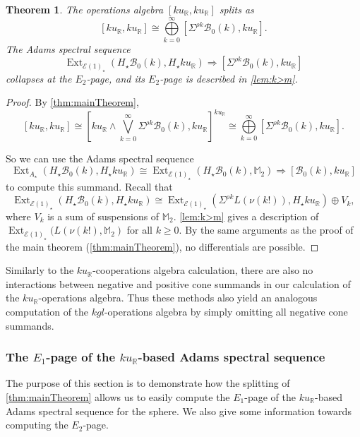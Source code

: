 \documentclass{amsart}
\newtheorem{theorem}[equation]{Theorem}
\theoremstyle{plain}
\numberwithin{equation}{section}
\numberwithin{figure}{section}
\DeclareMathOperator{\Ext}{Ext}
\newcommand{\mM}{{\mathbb M}}
\newcommand{\mR}{{\mathbb R}}
\newcommand{\cB}{{\mathcal B}}
\newcommand{\cE}{{\mathcal E}}
\newcommand{\0}{\langle 0 \rangle }
\begin{document}
\begin{theorem} \label{thm:operationsAlgebra}
     The operations algebra $[ku_\mR, ku_\mR]$ splits as
     \[ [ku_\mR, ku_\mR] \cong \bigoplus\limits_{k=0}^{\infty}[\Sigma^{\rho k}\cB_{0}(k), ku_\mR] .\]
     The Adams spectral sequence 
     \[
     \Ext_{\cE(1)_{\star}}(H_{\star}\cB_{0}(k), H_{\star}ku_\mR) \Longrightarrow [\Sigma^{\rho k}\cB_{0}(k), ku_\mR]
     \] 
     collapses at the $E_{2}$-page, and its $E_{2}$-page is described in \cref{lem:k>m}.
\end{theorem}

\begin{proof}
By \cref{thm:mainTheorem}, \[ [ku_{\mR}, ku_{\mR}] \cong \left[ku_\mR \wedge \bigvee\limits_{k=0}^{\infty} \Sigma^{\rho k}\cB_{0}(k), ku_\mR \right]^{ku_{\mR}} \cong \bigoplus\limits_{k=0}^{\infty}\left[ \Sigma^{\rho k}\cB_{0}(k), ku_\mR \right].\]

So we can use the Adams spectral sequence 
\[ \Ext_{A_{\star}}(H_{\star}\cB_{0}(k), H_{\star}ku_{\mR})  \cong \Ext_{\cE(1)_{\star}}(H_{\star}\cB_{0}(k), \mM_{2}) \Longrightarrow  [\cB_{0}(k), ku_\mR] \] to compute this summand.
Recall that \[\Ext_{\cE(1)_{\star}}(H_{\star}\cB_{0}\left( k \right), H_{\star}ku_\mR) \cong \Ext_{\cE(1)_{\star}}(\Sigma^{\rho k}L(\nu(k!)), H_{\star}ku_\mR) \oplus V_{k},\]
where $V_{k}$ is a sum of suspensions of $\mM_{2}$.
\cref{lem:k>m} gives a description of  \newline $\Ext_{\cE(1)_{\star}}(L(\nu(k!), \mM_{2})$ for all $k \geq 0$. By the same arguments as the proof of the main theorem (\cref{thm:mainTheorem}), no differentials are possible.
\end{proof}

Similarly to the $ku_\mR$-cooperations algebra calculation, there are also no interactions between negative and positive cone summands in our calculation of the $ku_\mR$-operations algebra. Thus these methods also yield an analogous computation of the $kgl$-operations algebra by simply omitting all negative cone summands. 

\subsubsection{The $E_{1}$-page of the $ku_{\mR}$-based Adams spectral sequence}\label{sec:E1kuR}
The purpose of this section is to demonstrate how the splitting of \cref{thm:mainTheorem} allows us to easily compute the $E_{1}$-page of the $ku_{\mR}$-based Adams spectral sequence for the sphere. We also give some information towards computing the $E_2$-page.
\end{document}
